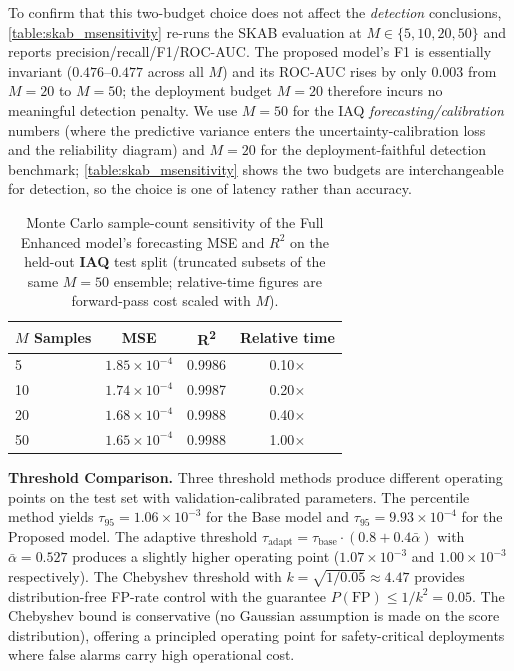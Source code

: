 To confirm that this two-budget choice does not affect the \emph{detection} conclusions, \cref{table:skab_msensitivity} re-runs the SKAB evaluation at $M\in\{5,10,20,50\}$ and reports precision/recall/F1/ROC-AUC. The proposed model's F1 is essentially invariant ($0.476$--$0.477$ across all $M$) and its ROC-AUC rises by only $0.003$ from $M=20$ to $M=50$; the deployment budget $M=20$ therefore incurs no meaningful detection penalty. We use $M=50$ for the IAQ \emph{forecasting/calibration} numbers (where the predictive variance enters the uncertainty-calibration loss and the reliability diagram) and $M=20$ for the deployment-faithful detection benchmark; \cref{table:skab_msensitivity} shows the two budgets are interchangeable for detection, so the choice is one of latency rather than accuracy.



\begin{table}[H]
\centering
\caption{Monte Carlo sample-count sensitivity of the Full Enhanced model's forecasting MSE and $R^2$ on the held-out \textbf{IAQ} test split (truncated subsets of the same $M=50$ ensemble; relative-time figures are forward-pass cost scaled with $M$).}
\label{table:mc_sensitivity}
\begin{tabular}{lccc}
\toprule
\textbf{$M$ Samples} & \textbf{MSE} & \textbf{R\textsuperscript{2}} & \textbf{Relative time} \\
\midrule
5   & $1.85\times 10^{-4}$ & 0.9986 & 0.10$\times$ \\
10  & $1.74\times 10^{-4}$ & 0.9987 & 0.20$\times$ \\
20  & $1.68\times 10^{-4}$ & 0.9988 & 0.40$\times$ \\
50  & $1.65\times 10^{-4}$ & 0.9988 & 1.00$\times$ \\
\bottomrule
\end{tabular}
\end{table}

\textbf{Threshold Comparison.} Three threshold methods produce different operating points on the test set with validation-calibrated parameters. The percentile method yields $\tau_{95} = 1.06\times 10^{-3}$ for the Base model and $\tau_{95} = 9.93\times 10^{-4}$ for the Proposed model. The adaptive threshold $\tau_{\text{adapt}} = \tau_{\text{base}} \cdot (0.8 + 0.4\bar{\alpha})$ with $\bar{\alpha} = 0.527$ produces a slightly higher operating point ($1.07\times 10^{-3}$ and $1.00\times 10^{-3}$ respectively). The Chebyshev threshold with $k = \sqrt{1/0.05} \approx 4.47$ provides distribution-free FP-rate control with the guarantee $P(\text{FP}) \leq 1/k^2 = 0.05$. The Chebyshev bound is conservative (no Gaussian assumption is made on the score distribution), offering a principled operating point for safety-critical deployments where false alarms carry high operational cost.